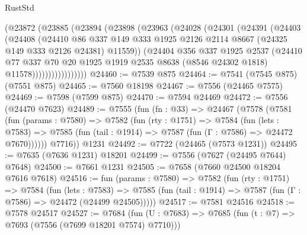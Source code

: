 \begin{lexlean}{RustStd}
\begin{coremodule}
{\begin{coremodule}
{{{{{{{{{{{{{{{{{{{{{{{{{{{{{{{{{{{{{{{{{{{                (@23872
                  (@23885
                    (@23894
                      (@23898
                        (@23963
                          (@24028
                            (@24301
                              (@24391
                                (@24403
                                  (@24408
                                    (@24410
                                      @86
                                      @337
                                      @149
                                      @333
                                      @1925
                                      @2126
                                      @2114
                                      @8667
                                      (@24325 @149 @333 @2126 @24381)
                                      @11559))
                                  (@24404
                                    @356
                                    @337
                                    @1925
                                    @2537
                                    (@24410
                                      @77
                                      @337
                                      @70
                                      @20
                                      @1925
                                      @1919
                                      @2535
                                      @8638
                                      (@8546 @24302 @1818)
                                      @11578)))))))))))))))))
@24460 := @7539 @875
@24464 := @7541 (@7545 @875) (@7551 @875)
@24465 := @7560 @18198
@24467 := @7556 (@24465 @7575)
@24469 := @7598 (@7599 @875)
@24470 := @7594 @24469
@24472 := @7556 (@24470 @7623)
@24489 := @7555
    (fun (fn : @33) =>
    @24467
      (@7578
        (@7581
          (fun (params : @7580) =>
          @7582
            (fun (rty : @1751) =>
            @7584
              (fun (lets : @7583) =>
              @7585 (fun (tail : @1914) => @7587 (fun (Γ : @7586) => @24472 @7670))))))
        @7716))
    @1231
@24492 := @7722 (@24465 (@7573 @1231))
@24495 := @7635 (@7636 @1231) @18201
@24499 := @7556 (@7627 (@24495 @7644) @7648)
@24500 := @7661 @1231
@24505 := @7658 (@7660 @24500 @18204 @7616 @7618)
@24516 := fun (params : @7580) =>
  @7582
    (fun (rty : @1751) =>
    @7584
      (fun (lets : @7583) =>
      @7585 (fun (tail : @1914) => @7587 (fun (Γ : @7586) => @24472 (@24499 @24505)))))
@24517 := @7581 @24516
@24518 := @7578 @24517
@24527 := @7684
    (fun (U : @7683) => @7685 (fun (t : @7) => @7693 (@7556 (@7699 @18201 @7574) @7710)))
}}}}}}}}}}}}}}}}}}}}}}}}}}}}}}}}}}}}}}}}}}}
\end{coremodule}}
\end{coremodule}
\end{lexlean}
